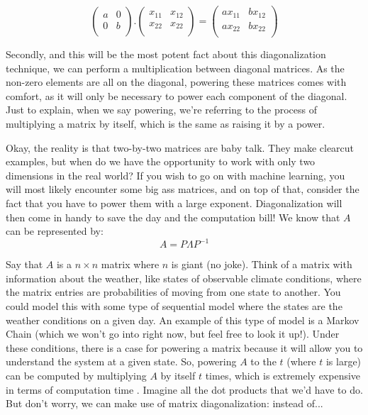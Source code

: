 \documentclass[a4,12pt,twosided,openany]{memoir}
\begin{document}
\[\begin{pmatrix}
a & 0 \\
0 & b \\
\end{pmatrix}.\begin{pmatrix}
x_{11} & x_{12}  \\
x_{22} & x_{22}  \\
\end{pmatrix} = \begin{pmatrix}
ax_{11} & bx_{12}  \\
ax_{22} & bx_{22}  \\
\end{pmatrix}
\]
\par 
\indent
Secondly, and this will be the most potent fact about this diagonalization technique, we can perform a multiplication between diagonal matrices. As the non-zero elements are all on the diagonal, powering these matrices comes with comfort, as it will only be necessary to power each component of the diagonal. Just to explain, when we say powering, we’re referring to the process of multiplying a matrix by itself, which is the same as raising it by a power.
\par 
\indent
Okay, the reality is that two-by-two matrices are baby talk. They make clearcut examples, but when do we have the opportunity to work with only two dimensions in the real world? If you wish to go on with machine learning, you will most likely encounter some big ass matrices, and on top of that, consider the fact that you have to power them with a large exponent. Diagonalization will then come in handy to save the day and the computation bill! We know that $A$ can be represented by:
\[A = P \Lambda P^{-1}\]
\par 
\indent
Say that $A$ is a $n \times n$ matrix where $n$ is giant (no joke). Think of a matrix with information about the weather, like states of observable climate conditions, where the matrix entries are probabilities of moving from one state to another. You could model this with some type of sequential model where the states are the weather conditions on a given day. An example of this type of model is a Markov Chain (which we won’t go into right now, but feel free to look it up!). Under these conditions, there is a case for powering a matrix because it will allow you to understand the system at a given state. So, powering $A$ to the $t$ (where $t$ is large) can be computed by multiplying $A$ by itself $t$ times, which is extremely expensive in terms of computation time . Imagine all the dot products that we’d have to do. But don’t worry, we can make use of matrix diagonalization: instead of...
\end{document}
